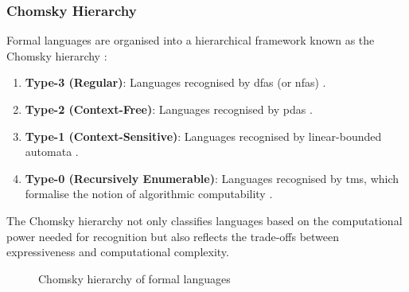\subsubsection{Chomsky Hierarchy}
Formal languages are organised into a hierarchical framework known as the Chomsky hierarchy \cite{chomsky1956three, hopcroft2006introduction}:
\begin{enumerate}
    \item \textbf{Type-3 (Regular)}: Languages recognised by \glspl{dfa} (or \glspl{nfa}) \cite{hopcroft2006introduction}.
    \item \textbf{Type-2 (Context-Free)}: Languages recognised by \glspl{pda} \cite{chomsky1956three}.
    \item \textbf{Type-1 (Context-Sensitive)}: Languages recognised by linear-bounded automata \cite{chomsky1956three}.
    \item \textbf{Type-0 (Recursively Enumerable)}: Languages recognised by \glspl{tm}, which formalise the notion of algorithmic computability \cite{hopcroft2006introduction, turing1936computable}.
\end{enumerate}

\begin{concept}
The Chomsky hierarchy not only classifies languages based on the computational power needed for recognition but also reflects the trade-offs between expressiveness and computational complexity.
\end{concept}

\begin{figure}[h]
    \centering
    \caption{Chomsky hierarchy of formal languages}
    \label{fig:chomsky-hierarchy}
\end{figure}

